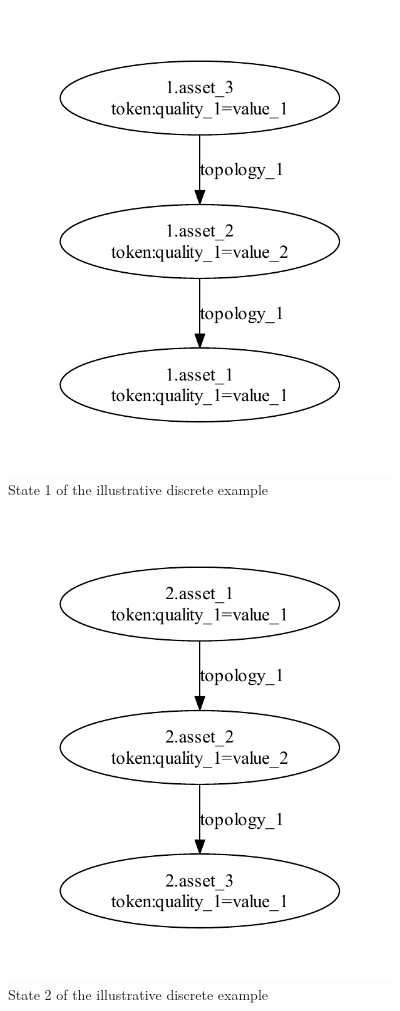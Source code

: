 \begin{figure}
\includegraphics[width=4in]{ag_illustrative_simple/nm_state1}
\caption{State 1 of the illustrative discrete example}
\label{fig:ill_topology_1}
\end{figure}

\begin{figure}
\includegraphics[width=4in]{ag_illustrative_simple/nm_state2}
\caption{State 2 of the illustrative discrete example}
\label{fig:ill_topology_2}
\end{figure}

